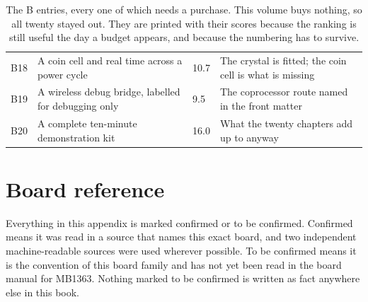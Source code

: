 \begin{table}[H]
\begin{tabular}{p{9mm}p{82mm}p{11mm}p{43mm}}
B18 & A coin cell and real time across a power cycle & 10.7 & The crystal is fitted; the coin cell is what is missing \\
B19 & A wireless debug bridge, labelled for debugging only & 9.5 & The coprocessor route named in the front matter \\
B20 & A complete ten-minute demonstration kit & 16.0 & What the twenty chapters add up to anyway \\
\bottomrule
\end{tabular}
\caption{The B entries, every one of which needs a purchase. This volume buys nothing, so all twenty stayed out. They are printed with their scores because the ranking is still useful the day a budget appears, and because the numbering has to survive.}
\end{table}

\section{Board reference}

Everything in this appendix is marked confirmed or to be confirmed. Confirmed
means it was read in a source that names this exact board, and two independent
machine-readable sources were used wherever possible. To be confirmed means it
is the convention of this board family and has not yet been read in the board
manual for MB1363. Nothing marked to be confirmed is written as fact anywhere
else in this book.

